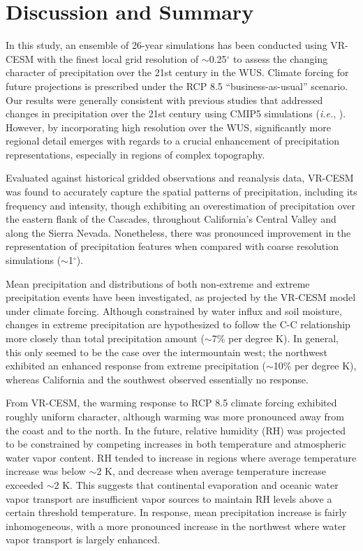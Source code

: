\documentclass{ametsoc}
\begin{document}
\section{Discussion and Summary} \label{sec:Summary}

In this study, an ensemble of 26-year simulations has been conducted using VR-CESM with the finest local grid resolution of $\sim$0.25$^\circ$ to assess the changing character of precipitation over the 21st century in the WUS. Climate forcing for future projections is prescribed under the RCP 8.5 ``business-as-usual'' scenario. Our results were generally consistent with previous studies that addressed changes in precipitation over the 21st century using CMIP5 simulations (\textit{i.e.}, \cite{sillmann2013climate}). However, by incorporating high resolution over the WUS, significantly more regional detail emerges with regards to a crucial enhancement of precipitation representations, especially in regions of complex topography.

Evaluated against historical gridded observations and reanalysis data, VR-CESM was found to accurately capture the spatial patterns of precipitation, including its frequency and intensity, though exhibiting an overestimation of precipitation over the eastern flank of the Cascades, throughout California's Central Valley and along the Sierra Nevada. Nonetheless, there was pronounced improvement in the representation of precipitation features when compared with coarse resolution simulations ($\sim$1$^\circ$).

Mean precipitation and distributions of both non-extreme and extreme precipitation events have been investigated, as projected by the VR-CESM model under climate forcing.  Although constrained by water influx and soil moisture, changes in extreme precipitation are hypothesized to follow the C-C relationship more closely than total precipitation amount ($\sim$7\% per degree K).  In general, this only seemed to be the case over the intermountain west; the northwest exhibited an enhanced response from extreme precipitation ($\sim$10\% per degree K), whereas California and the southwest observed essentially no response.

From VR-CESM, the warming response to RCP 8.5 climate forcing exhibited roughly uniform character, although warming was more pronounced away from the coast and to the north.  In the future, relative humidity (RH) was projected to be constrained by competing increases in both temperature and atmospheric water vapor content. RH tended to increase in regions where average temperature increase was below $\sim$2 K, and decrease when average temperature increase exceeded $\sim$2 K. This suggests that continental evaporation and oceanic water vapor transport are insufficient vapor sources to maintain RH levels above a certain threshold temperature.  In response, mean precipitation increase is fairly inhomogeneous, with a more pronounced increase in the northwest where water vapor transport is largely enhanced.
\end{document}
